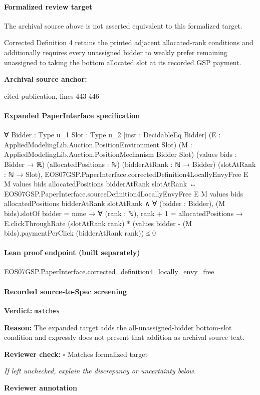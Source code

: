 \documentclass[10pt]{article}
\newcommand{\reviewerbox}{%
  \par\noindent\fbox{\parbox{0.96\linewidth}{\rule{0pt}{0.38in}}}\par
}
\newcommand{\reviewmatch}[1]{%
  \par\noindent\textbf{Reviewer check:} $\square$\; #1\par
  \noindent\emph{If left unchecked, explain the discrepancy or uncertainty below.}\par
}
\begin{document}
\paragraph{Formalized review target}
The archival source above is not asserted equivalent to this formalized target.
\begin{ReviewVerbatim}
Corrected Definition 4 retains the printed adjacent allocated-rank conditions and additionally requires every unassigned bidder to weakly prefer remaining unassigned to taking the bottom allocated slot at its recorded GSP payment.
\end{ReviewVerbatim}

\textbf{Archival source anchor:} {\footnotesize\raggedright cited publication, lines 443-\allowbreak{}446\par}
\paragraph{Expanded PaperInterface specification}
\begin{ReviewVerbatim}
∀ {Bidder : Type u_1} {Slot : Type u_2} [inst : DecidableEq Bidder]
  (E : AppliedModelingLib.Auction.PositionEnvironment Slot)
  (M : AppliedModelingLib.Auction.PositionMechanism Bidder Slot) (values bids : Bidder → ℝ) (allocatedPositions : ℕ)
  (bidderAtRank : ℕ → Bidder) (slotAtRank : ℕ → Slot),
  EOS07GSP.PaperInterface.correctedDefinition4LocallyEnvyFree E M values bids allocatedPositions bidderAtRank
      slotAtRank ↔
    EOS07GSP.PaperInterface.sourceDefinition4LocallyEnvyFree E M values bids allocatedPositions bidderAtRank
        slotAtRank ∧
      ∀ (bidder : Bidder),
        (M bids).slotOf bidder = none →
          ∀ (rank : ℕ),
            rank + 1 = allocatedPositions →
              E.clickThroughRate (slotAtRank rank) * (values bidder - (M bids).paymentPerClick (bidderAtRank rank)) ≤ 0
\end{ReviewVerbatim}



\paragraph{Lean proof endpoint (built separately)}\begin{ReviewVerbatim}
EOS07GSP.PaperInterface.corrected_definition4_locally_envy_free
\end{ReviewVerbatim}

\paragraph{Recorded source-to-Spec screening}
\textbf{Verdict:} \texttt{matches}
\\
{\raggedright
\textbf{Reason:} The expanded target adds the all-\allowbreak{}unassigned-\allowbreak{}bidder bottom-\allowbreak{}slot condition and expressly does not present that addition as archival source text.\allowbreak{}
\par}
\reviewmatch{Matches formalized target}
\noindent\textbf{Reviewer annotation}\par
\reviewerbox
\clearpage
\hypertarget{source-claim-ce8f50923b43bde9}{}
\end{document}
